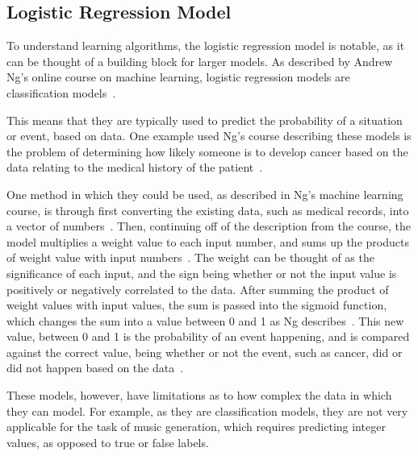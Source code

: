 \documentclass[12pt, titlepage]{article}
\begin{document}
\subsection{Logistic Regression Model}
To understand learning algorithms, the logistic regression model is notable, as
it can be thought of a building block for larger models. As described by Andrew
Ng's online course on machine learning, logistic regression
models are classification models~\cite{ngcourse}.

This means that they are typically used to predict the probability of a
situation or event, based on data. One example used Ng's course describing these
models is the problem of determining how likely someone is to develop cancer
based on the data relating to the medical history of the patient~\cite{ngcourse}.

One method in which they could be used, as described in Ng's machine learning
course, is through first converting the existing data, such as medical records,
into a vector of numbers~\cite{ngrepr}. Then, continuing off of the description
from the course, the model multiplies a weight value to each input number, and
sums up the products of weight value with input numbers~\cite{ngrepr}. The
weight can be thought of as the significance of each input, and the sign being
whether or not the input value is positively or negatively correlated to the
data. After summing the product of weight values with input values, the sum is
passed into the sigmoid function, which changes the sum into a value between 0
and 1 as Ng describes~\cite{ngrepr}. This new value, between 0 and 1 is the
probability of an event happening, and is compared against the correct value,
being whether or not the event, such as cancer, did or did not happen based on
the data~\cite{ngrepr}.

These models, however, have limitations as to how complex the data in which they
can model. For example, as they are classification models, they are not very
applicable for the task of music generation, which requires predicting integer
values, as opposed to true or false labels.
\end{document}
